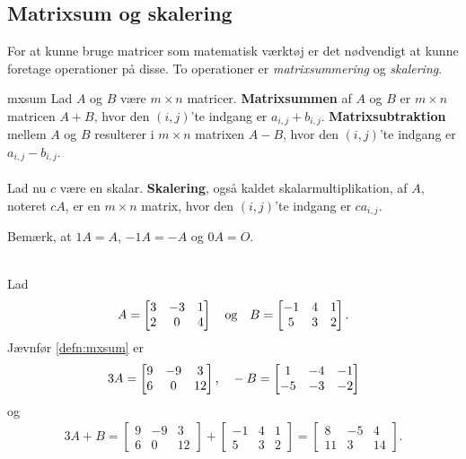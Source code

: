 \subsection{Matrixsum og skalering}
%
For at kunne bruge matricer som matematisk værktøj er det nødvendigt at kunne foretage operationer på disse.
To operationer er \textit{matrixsummering} og \textit{skalering}.
%
\begin{defn}{}{mxsum}
Lad $A$ og $B$ være $m \times n$ matricer.
\textbf{Matrixsummen} af $A$ og $B$ er $m \times n$ matricen $A + B$, hvor den $(i,j)$'te indgang er $a_{i,j} + b_{i,j}$.
\textbf{Matrixsubtraktion} mellem $A$ og $B$ resulterer i $m \times n$ matrixen $A-B$, hvor den $(i,j)$'te indgang er $a_{i,j} - b_{i,j}$.
\\\\
Lad nu $c$ være en skalar.
\textbf{Skalering}, også kaldet skalarmultiplikation, af $A$, noteret $cA$, er en $m \times n$ matrix, hvor den $(i,j)$'te indgang er $ca_{i,j}$.
\end{defn}
\noindent
%
Bemærk, at $1A = A$, $-1A = -A$ og $0A = O$.
\\\\
%
\begin{eks}
Lad 
\begin{align*}
A= 
\begin{bmatrix}
3	&	-3	&	1\\
2	&	0	&	4
\end{bmatrix}
\text{\phantom{---}og\phantom{---}}
B= 
\begin{bmatrix}
-1	&	4	&	1\\
5	&	3	&	2
\end{bmatrix}.
\end{align*}
Jævnfør \ref{defn:mxsum} er
\begin{align*}
3A= 
\begin{bmatrix}
9	&	-9	&	3\\
6	&	0	&	12
\end{bmatrix}
\text{,\phantom{---}}
-B= 
\begin{bmatrix}
1	&	-4	&	-1\\
-5	&	-3	&	-2
\end{bmatrix}
\end{align*}
og
\begin{align*}
3A+B= 
\begin{bmatrix}
9	&	-9	&	3\\
6	&	0	&	12
\end{bmatrix}
+ 
\begin{bmatrix}
-1	&	4	&	1\\
5	&	3	&	2
\end{bmatrix}
=
\begin{bmatrix}
8	&	-5	&	4\\
11	&	3	&	14
\end{bmatrix}.
\end{align*}
\end{eks}
